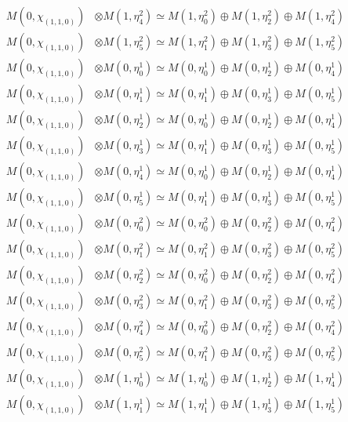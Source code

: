 \begin{align*}
M(0,\chi_{(1,1,0)}) &\otimes M(1,\eta^{2}_{4}) \simeq M(1,\eta^{2}_{0}) \oplus M(1,\eta^{2}_{2}) \oplus M(1,\eta^{2}_{4}) \\
M(0,\chi_{(1,1,0)}) &\otimes M(1,\eta^{2}_{5}) \simeq M(1,\eta^{2}_{1}) \oplus M(1,\eta^{2}_{3}) \oplus M(1,\eta^{2}_{5}) \\
M(0,\chi_{(1,1,0)}) &\otimes M(0,\eta^{1}_{0}) \simeq M(0,\eta^{1}_{0}) \oplus M(0,\eta^{1}_{2}) \oplus M(0,\eta^{1}_{4}) \\
M(0,\chi_{(1,1,0)}) &\otimes M(0,\eta^{1}_{1}) \simeq M(0,\eta^{1}_{1}) \oplus M(0,\eta^{1}_{3}) \oplus M(0,\eta^{1}_{5}) \\
M(0,\chi_{(1,1,0)}) &\otimes M(0,\eta^{1}_{2}) \simeq M(0,\eta^{1}_{0}) \oplus M(0,\eta^{1}_{2}) \oplus M(0,\eta^{1}_{4}) \\
M(0,\chi_{(1,1,0)}) &\otimes M(0,\eta^{1}_{3}) \simeq M(0,\eta^{1}_{1}) \oplus M(0,\eta^{1}_{3}) \oplus M(0,\eta^{1}_{5}) \\
M(0,\chi_{(1,1,0)}) &\otimes M(0,\eta^{1}_{4}) \simeq M(0,\eta^{1}_{0}) \oplus M(0,\eta^{1}_{2}) \oplus M(0,\eta^{1}_{4}) \\
M(0,\chi_{(1,1,0)}) &\otimes M(0,\eta^{1}_{5}) \simeq M(0,\eta^{1}_{1}) \oplus M(0,\eta^{1}_{3}) \oplus M(0,\eta^{1}_{5}) \\
M(0,\chi_{(1,1,0)}) &\otimes M(0,\eta^{2}_{0}) \simeq M(0,\eta^{2}_{0}) \oplus M(0,\eta^{2}_{2}) \oplus M(0,\eta^{2}_{4}) \\
M(0,\chi_{(1,1,0)}) &\otimes M(0,\eta^{2}_{1}) \simeq M(0,\eta^{2}_{1}) \oplus M(0,\eta^{2}_{3}) \oplus M(0,\eta^{2}_{5}) \\
M(0,\chi_{(1,1,0)}) &\otimes M(0,\eta^{2}_{2}) \simeq M(0,\eta^{2}_{0}) \oplus M(0,\eta^{2}_{2}) \oplus M(0,\eta^{2}_{4}) \\
M(0,\chi_{(1,1,0)}) &\otimes M(0,\eta^{2}_{3}) \simeq M(0,\eta^{2}_{1}) \oplus M(0,\eta^{2}_{3}) \oplus M(0,\eta^{2}_{5}) \\
M(0,\chi_{(1,1,0)}) &\otimes M(0,\eta^{2}_{4}) \simeq M(0,\eta^{2}_{0}) \oplus M(0,\eta^{2}_{2}) \oplus M(0,\eta^{2}_{4}) \\
M(0,\chi_{(1,1,0)}) &\otimes M(0,\eta^{2}_{5}) \simeq M(0,\eta^{2}_{1}) \oplus M(0,\eta^{2}_{3}) \oplus M(0,\eta^{2}_{5}) \\
M(0,\chi_{(1,1,0)}) &\otimes M(1,\eta^{1}_{0}) \simeq M(1,\eta^{1}_{0}) \oplus M(1,\eta^{1}_{2}) \oplus M(1,\eta^{1}_{4}) \\
M(0,\chi_{(1,1,0)}) &\otimes M(1,\eta^{1}_{1}) \simeq M(1,\eta^{1}_{1}) \oplus M(1,\eta^{1}_{3}) \oplus M(1,\eta^{1}_{5}) \\

\end{align*}
